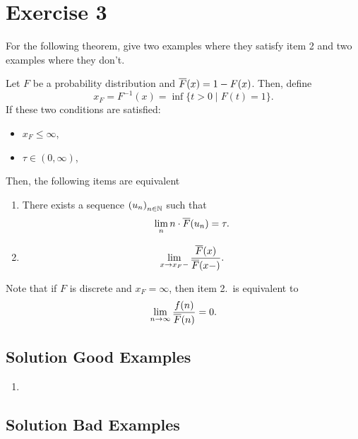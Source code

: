 \section{Exercise 3}

For the following theorem, give two examples where they satisfy item 2 and two examples where they don't.

\begin{theorem}
    Let $F$ be a probability distribution and $\overline{F}(x) = 1-F(x)$. Then, define
    \[ x_F = F^{-1}(x) = \inf\{t > 0 \;|\; F(t) = 1\}. \]
    If these two conditions are satisfied:
    \begin{itemize}
        \item $x_F \leq \infty$,
        \item $\tau \in (0,\infty)$,
    \end{itemize}
    Then, the following items are equivalent
    \begin{enumerate}
        \item There exists a sequence ${(u_n)}_{n\in\mathbb{N}}$ such that
        \[ \lim_n n \cdot \overline{F}(u_n) = \tau. \]
        \item 
        \[ \lim_{x\to x_F-} \frac{\overline{F}(x)}{\overline{F}(x-)}. \]
    \end{enumerate}
    Note that if $F$ is discrete and $x_F = \infty$, then item 2.~is equivalent to
    \[ \lim_{n \to \infty} \frac{f(n)}{\overline{F}(n)} = 0.\]
\end{theorem}
\subsection*{Solution Good Examples}

\begin{enumerate}
    \item 
\end{enumerate}

\subsection*{Solution Bad Examples}

